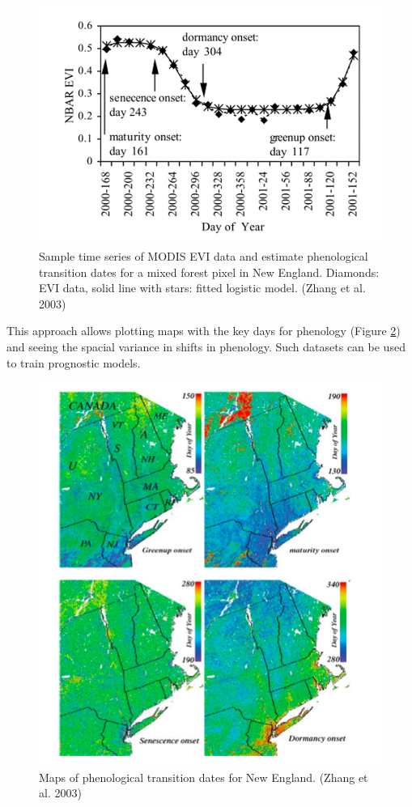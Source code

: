 \documentclass[12pt,oneside]{book}
\begin{document}
\begin{figure}

{\centering \includegraphics[width=0.8\linewidth]{figures/chap4/f44_zhang} 

}

\caption{Sample time series of MODIS EVI data and estimate phenological transition dates for a mixed forest pixel in New England. Diamonds: EVI data, solid line with stars: fitted logistic model. (Zhang et al. 2003)}\label{fig:f44}
\end{figure}

This approach allows plotting maps with the key days for phenology
(Figure \ref{fig:f45}) and seeing the spacial variance in shifts in
phenology. Such datasets can be used to train prognostic models.

\begin{figure}

{\centering \includegraphics[width=0.8\linewidth]{figures/chap4/f45_zhang_map} 

}

\caption{Maps of phenological transition dates for New England. (Zhang et al. 2003)}\label{fig:f45}
\end{figure}
\end{document}
